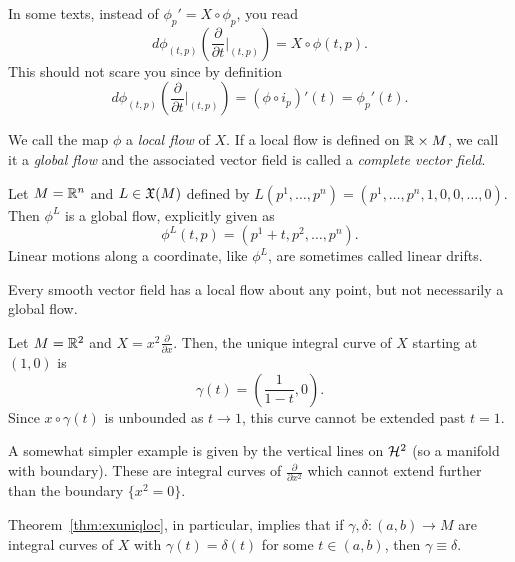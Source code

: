 \begin{remark}
	In some texts, instead of $\phi_p' = X\circ\phi_p$, you read
	\begin{equation}
		d\phi_{(t,p)}\left(\frac{\partial}{\partial t}\Big|_{(t,p)}\right) = X \circ \phi(t,p).
	\end{equation}
	This should not scare you since by definition
	\begin{equation}
		d\phi_{(t,p)}\left(\frac{\partial}{\partial t}\Big|_{(t,p)}\right) = (\phi \circ i_p)'(t) = \phi_p'(t).
	\end{equation}
\end{remark}

We call the map $\phi$ a \emph{local flow} of $X$.
If a local flow is defined on $\mathbb{R}\times M$, we call it a \emph{global flow} and the associated vector field is called a \emph{complete vector field}.

\begin{example}\label{example:lineardrift}
	Let $M=\mathbb{R}^n$ and $L\in\mathfrak{X}(M)$ defined by $L(p^1, \ldots, p^n) = (p^1, \ldots, p^n, 1, 0, 0, \ldots, 0)$.
	Then $\phi^L$ is a global flow, explicitly given as
	\begin{equation}
		\phi^L(t,p) = (p^1+t, p^2, \ldots, p^n).
	\end{equation}
	Linear motions along a coordinate, like $\phi^L$, are sometimes called linear drifts.
\end{example}

Every smooth vector field has a local flow about any point, but not necessarily a global flow.
\begin{example}\label{ex:non-complete}
	Let $M = \mathbb{R}^2$ and $X = x^2 \frac{\partial}{\partial x}$.
	Then, the unique integral curve of $X$ starting at $(1,0)$ is
	\begin{equation}
		\gamma(t) = \left(\frac{1}{1-t}, 0\right).
	\end{equation}
	Since $x \circ \gamma(t)$ is unbounded as $t\to 1$, this curve cannot be extended past $t=1$.

	A somewhat simpler example is given by the vertical lines on $\mathcal{H}^2$ (so a manifold with boundary). These are integral curves of $\frac{\partial}{\partial x^2}$ which cannot extend further than the boundary $\{x^2=0\}$.
\end{example}

Theorem~\ref{thm:exuniqloc}, in particular, implies that if $\gamma, \delta : (a,b)\to M$ are integral curves of $X$ with $\gamma(t) = \delta(t)$ for some $t \in(a,b)$, then $\gamma\equiv\delta$.

